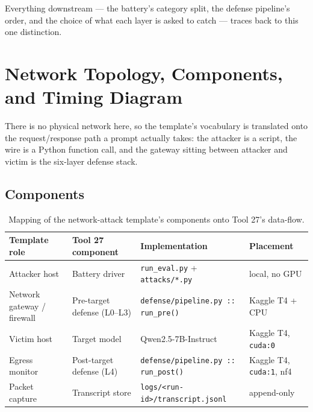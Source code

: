 \documentclass[11pt,a4paper]{article}
\begin{document}
Everything downstream --- the battery's category split, the defense pipeline's order, and the choice of what each layer is asked to catch --- traces back to this one distinction.

\section{Network Topology, Components, and Timing Diagram}

There is no physical network here, so the template's vocabulary is translated onto the request/response path a prompt actually takes: the attacker is a script, the wire is a Python function call, and the gateway sitting between attacker and victim is the six-layer defense stack.

\subsection{Components}

\begin{table}[!ht]
\centering\small
\begin{tabular}{@{}p{3.1cm}p{3.1cm}p{4.0cm}p{3.0cm}@{}}
\toprule
\textbf{Template role} & \textbf{Tool 27 component} & \textbf{Implementation} & \textbf{Placement} \\
\midrule
Attacker host & Battery driver & \texttt{run\_eval.py} + \texttt{attacks/*.py} & local, no GPU \\
Network gateway / firewall & Pre-target defense (L0--L3) & \texttt{defense/pipeline.py :: run\_pre()} & Kaggle T4 + CPU \\
Victim host & Target model & Qwen2.5-7B-Instruct & Kaggle T4, \texttt{cuda:0} \\
Egress monitor & Post-target defense (L4) & \texttt{defense/pipeline.py :: run\_post()} & Kaggle T4, \texttt{cuda:1}, nf4 \\
Packet capture & Transcript store & \texttt{logs/\textless run-id\textgreater/}\newline\texttt{transcript.jsonl} & append-only \\
\bottomrule
\end{tabular}
\caption{Mapping of the network-attack template's components onto Tool 27's data-flow.}
\end{table}
\end{document}
